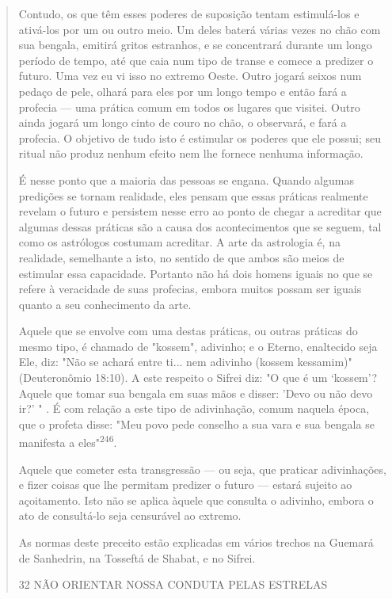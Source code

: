 \begin{quote}
Contudo, os que têm esses poderes de suposição tentam estimulá-los e
ativá-los por um ou outro meio. Um deles baterá várias vezes no chão com
sua bengala, emitirá gritos estranhos, e se concentrará durante um longo
perío­do de tempo, até que caia num tipo de transe e comece a predizer o
futuro. Uma vez eu vi isso no extremo Oeste. Outro jogará seixos num
pedaço de pele, olhará para eles por um longo tempo e então fará a
profecia --- uma prática co­mum em todos os lugares que visitei. Outro
ainda jogará um longo cinto de couro no chão, o observará, e fará a
profecia. O objetivo de tudo isto é estimu­lar os poderes que ele
possui; seu ritual não produz nenhum efeito nem lhe fornece nenhuma
informação.

É nesse ponto que a maioria das pessoas se engana. Quando algumas
predições se tornam realidade, eles pensam que essas práticas realmente
reve­lam o futuro e persistem nesse erro ao ponto de chegar a acreditar
que algumas dessas práticas são a causa dos acontecimentos que se
seguem, tal como os as­trólogos costumam acreditar. A arte da astrologia
é, na realidade, semelhante a isto, no sentido de que ambos são meios de
estimular essa capacidade. Portanto não há 
dois homens iguais no que se refere à veracidade de suas
profe­cias, embora muitos possam ser iguais quanto a seu conhecimento da
arte.

Aquele que se envolve com uma destas práticas, ou outras práticas do
mesmo tipo, é chamado de "kossem", adivinho; e o Eterno, enaltecido seja
Ele, diz: "Não se achará entre ti... nem adivinho (kossem kessamim)"
(Deutero­nômio 18:10). A este respeito o Sifrei diz: "O que é um
`kossem'? Aquele que tomar sua bengala em suas mãos e disser: 'Devo ou
não devo ir?' " . É com rela­ção a este tipo de adivinhação, comum
naquela época, que o profeta disse: "Meu povo pede conselho a sua vara e
sua bengala se manifesta a eles"\textsuperscript{246}.

Aquele que cometer esta transgressão --- ou seja, que praticar
adivi­nhações, e fizer coisas que lhe permitam predizer o futuro ---
estará sujeito ao açoitamento. Isto não se aplica àquele que consulta o
adivinho, embora o ato de consultá-lo seja censurável ao extremo.

As normas deste preceito estão explicadas em vários trechos na Gue­mará
de Sanhedrin, na Tosseftá de Shabat, e no Sifrei.

32 NÃO ORIENTAR NOSSA CONDUTA PELAS ESTRELAS


\end{quote}

